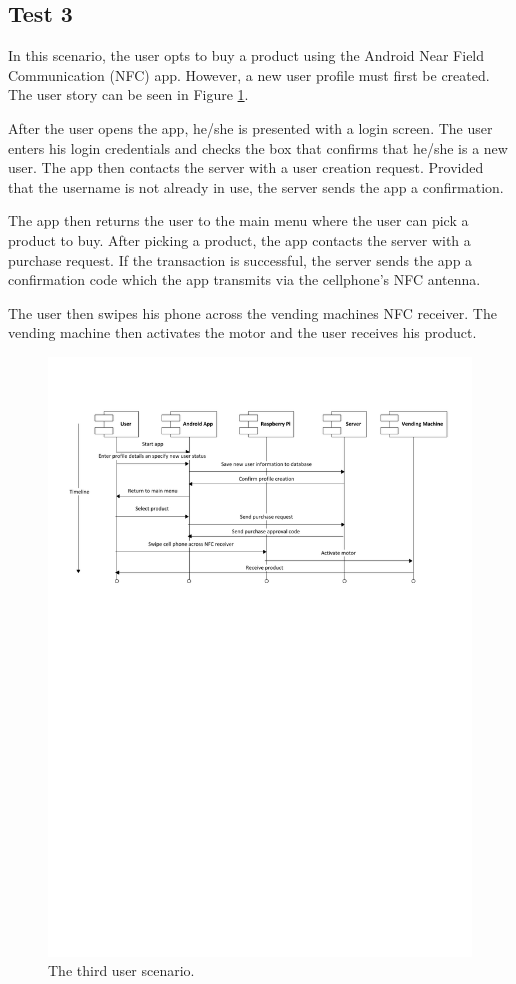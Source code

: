 \subsection{Test 3}

In this scenario, the user opts to buy a product using the Android Near Field
Communication (NFC) app. However, a new user profile must first be created. The user story
can be seen in Figure \ref{fig:test3}.

After the user opens the app, he/she is presented with a login screen. The user enters
his login credentials and checks the box that confirms that he/she is a new user. The
app then contacts the server with a user creation request. Provided that the username is
not already in use, the server sends the app a confirmation.

The app then returns the user to the main menu where the user can pick a product to buy.
After picking a product, the app contacts the server with a purchase request. If the
transaction is successful, the server sends the app a confirmation code which the app 
transmits via the cellphone's NFC antenna. 

The user then swipes his phone across the vending machines NFC receiver. The vending
machine then activates the motor and the user receives his product. 

\begin{figure}
 \centering 
 \includegraphics[clip=true, trim = 0 500 0 50,
 scale=0.7]{user_story_3}
 \caption{The third user scenario.}
 \label{fig:test3}
\end{figure}